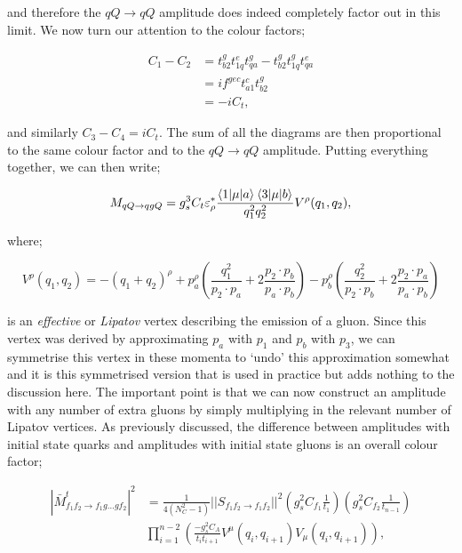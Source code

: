 and therefore the $qQ \to qQ$ amplitude does indeed completely factor out in this limit. We now turn our attention to the colour factors;

\begin{equation}
\begin{split}
C_1 - C_2 &= t^g_{b2} t^e_{1q} t^g_{qa} - t^g_{b2} t^g_{1q} t^e_{qa} \\
&=  if^{gec}t^c_{a1}t^g_{b2} \\
&= -i C_t,
\end{split}
\end{equation}

and similarly $C_3 - C_4 = iC_t$. The sum of all the diagrams are then proportional to the same colour factor and to the $qQ \to qQ$ amplitude. Putting everything together, we can then write;

\begin{equation}
M_{qQ \to qgQ} = g_s^3 C_t \varepsilon^*_\rho \frac{\mathinner{\langle1\vert\mu\vert a\rangle}_{} \mathinner{\langle3\vert\mu\vert b\rangle}_{}}{q_1^2 q_2^2} V^\rho (q_1, q_2),
\end{equation}

where;

\begin{equation}
V^\rho(q_1, q_2) = -(q_1 + q_2)^\rho + p_a^\rho \left( \frac{q_1^2}{p_2 \cdot p_a} + 2 \frac{p_2 \cdot p_b}{p_a \cdot p_b}\right) -  p_b^\rho \left( \frac{q_2^2}{p_2 \cdot p_b} + 2 \frac{p_2 \cdot p_a}{p_a \cdot p_b}\right)
\end{equation}

is an \emph{effective} or \emph{Lipatov} vertex describing the emission of a gluon. Since this vertex was derived by approximating $p_a$ with $p_1$ and $p_b$ with $p_3$, we can symmetrise this vertex in these momenta to `undo' this approximation somewhat and it is this symmetrised version that is used in practice but adds nothing to the discussion here. The important point is that we can now construct an amplitude with any number of extra gluons by simply multiplying in the relevant number of Lipatov vertices. As previously discussed, the difference between amplitudes with initial state quarks and amplitudes with initial state gluons is an overall colour factor;

\begin{equation}
\begin{split}
|\bar{M}^t_{f_1 f_2 \to f_1 g ... g f_2}|^2 &= \frac{1}{4 (N_C^2 - 1)} ||S_{f_1 f_2 \to f_1 f_2} ||^2 \left(g_s^2 C_{f_1} \frac{1}{t_1} \right) \left(g_s^2 C_{f_2} \frac{1}{t_{n-1}} \right) \\
& \prod_{i=1}^{n-2} \left(\frac{-g_s^2 C_{A}}{t_i t_{i+1}} V^\mu (q_i, q_{i+1}) V_\mu (q_i, q_{i+1})  \right),
 \end{split}
\end{equation}

